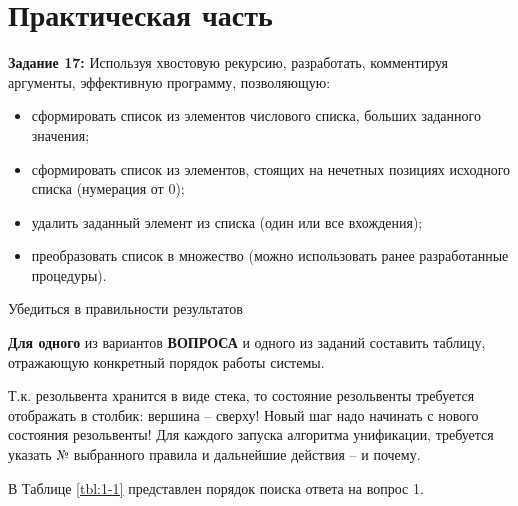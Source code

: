 \chapter{Практическая часть}

\textbf{Задание 17:} Используя хвостовую рекурсию, разработать, комментируя аргументы, эффективную программу, позволяющую:
\begin{itemize}
    \item сформировать список из элементов числового списка, больших заданного
значения;
    \item сформировать список из элементов, стоящих на нечетных позициях исходного
списка (нумерация от 0);
    \item удалить заданный элемент из списка (один или все вхождения);
    \item преобразовать список в множество (можно использовать ранее разработанные процедуры).
\end{itemize}

Убедиться в правильности результатов

\textbf{Для одного} из вариантов \textbf{ВОПРОСА} и одного из заданий составить таблицу, отражающую конкретный порядок работы системы.

Т.к. резольвента хранится в виде стека, то состояние резольвенты требуется отображать в столбик: вершина – сверху! Новый шаг надо начинать с нового состояния резольвенты! Для каждого запуска алгоритма унификации, требуется указать № выбранного правила и дальнейшие действия – и почему.

\clearpage



\clearpage


В Таблице \ref{tbl:1-1} представлен порядок поиска ответа на вопрос 1.

